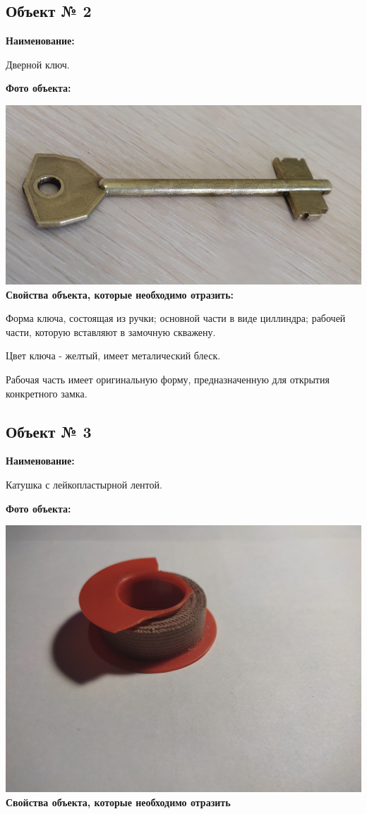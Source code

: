 \documentclass[12pt]{article}
\begin{document}
\subsection{Объект № 2}

{\bf Наименование:} 

Дверной ключ.

{\bf Фото объекта:}

\vskip 1cm
{
    \centering
    \includegraphics[width=1\linewidth]{ключ_без_дефекта.png}
    \label{fig:i1}
}
\vskip 1cm
{\bf Свойства объекта, которые необходимо отразить:}

Форма ключа, состоящая из ручки; основной части в виде циллиндра; рабочей части, которую вставляют в замочную скважену.

Цвет ключа - желтый, имеет металический блеск.

Рабочая часть имеет оригинальную форму, предназначенную для открытия конкретного замка.




    
 \subsection{Объект № 3}


{\bf Наименование:} 

Катушка с лейкопластырной лентой.

{\bf Фото объекта:}

\vskip 1cm
{
    \centering
    \includegraphics[width=0.7\linewidth]{катушка_от_сани.jpeg}
    \label{fig:i1}
}
\vskip 1cm
{\bf Свойства объекта, которые необходимо отразить}
\end{document}
